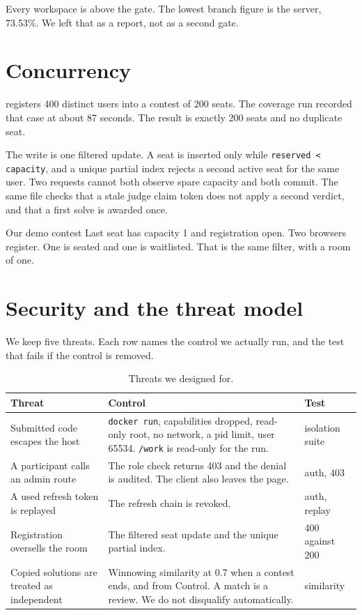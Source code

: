 \documentclass[11pt,a4paper]{article}
\begin{document}
Every workspace is above the gate. The lowest branch figure is the server, 73.53\%. We left that as a report, not as a second gate.

\section{Concurrency}
\label{sec:conc}

 registers 400 distinct users into a contest of 200 seats. The coverage run recorded that case at about 87 seconds. The result is exactly 200 seats and no duplicate seat.

The write is one filtered update. A seat is inserted only while \texttt{reserved < capacity}, and a unique partial index rejects a second active seat for the same user. Two requests cannot both observe spare capacity and both commit. The same file checks that a stale judge claim token does not apply a second verdict, and that a first solve is awarded once.

Our demo contest Last seat has capacity 1 and registration open. Two browsers register. One is seated and one is waitlisted. That is the same filter, with a room of one.

\section{Security and the threat model}
\label{sec:sec}

We keep five threats. Each row names the control we actually run, and the test that fails if the control is removed.

\begin{table}[ht]
\centering
\caption{Threats we designed for.}
\label{tab:threats}
{\small
\begin{tabularx}{\textwidth}{@{}l Y Y@{}}
\toprule
Threat & Control & Test \\
\midrule
Submitted code escapes the host &
\texttt{docker run}, capabilities dropped, read-only root, no network, a pid limit, user 65534. \texttt{/work} is read-only for the run. &
isolation suite \\
A participant calls an admin route &
The role check returns 403 and the denial is audited. The client also leaves the page. &
auth, 403 \\
A used refresh token is replayed &
The refresh chain is revoked. &
auth, replay \\
Registration oversells the room &
The filtered seat update and the unique partial index. &
400 against 200 \\
Copied solutions are treated as independent &
Winnowing similarity at 0.7 when a contest ends, and from Control. A match is a review. We do not disqualify automatically. &
similarity \\
\bottomrule
\end{tabularx}
}
\end{table}
\end{document}

